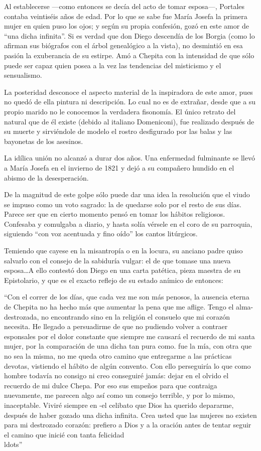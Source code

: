\documentclass[10pt,twoside,openright]{memoir}
\begin{document}
Al establecerse ---como entonces se decía del acto de tomar esposa---,
Portales contaba veintiséis años de edad. Por lo que se sabe fue María
Josefa la primera mujer en quien puso los ojos; y según su propia
confesión, gozó en este amor de ``una dicha infinita''.
Si es verdad que don Diego descendía
de los Borgia (como lo afirman sus biógrafos con el árbol genealógico a
la vista), no desmintió en esa pasión la exuberancia de su estirpe. Amó
a Chepita con la intensidad de que sólo puede ser capaz quien posea a la
vez las tendencias del misticismo y el sensualismo.

La posteridad desconoce el aspecto material de la inspiradora de este
amor, pues no quedó de ella pintura ni descripción. Lo cual no es de
extrañar, desde que a su propio marido no le conocemos la verdadera
fisonomía. El único retrato del natural que de él existe (debido al
italiano Domeniconi), fue realizado después de su muerte y sirviéndole
de modelo el rostro desfigurado por las balas y las bayonetas de los
asesinos.

La idílica unión no alcanzó a durar dos años. Una enfermedad fulminante
se llevó a María Josefa en el invierno de 1821 y dejó a su compañero
hundido en el abismo de la desesperación.

De
la magnitud de este golpe sólo puede dar una idea la resolución que el
viudo se impuso como un voto sagrado: la de quedarse solo por el resto
de sus días. Parece ser que en cierto momento pensó en tomar los hábitos
religiosos. Confesaba y comulgaba a diario, y hasta solía vérsele en el
coro de su parroquia, siguiendo ``con voz acentuada y fino oído'' los
cantos litúrgicos.

Temiendo que cayese en la misantropía o en la locura, su anciano padre
quiso salvarlo con el consejo de la sabiduría vulgar: el de que tomase
una nueva esposa\ldots A ello contestó don Diego en una carta patética,
pieza maestra de su Epistolario, y que es el exacto reflejo de su estado
anímico de entonces:

``Con el correr de los días, que cada
vez me son más penosos, la ausencia eterna de Chepita no ha hecho más
que aumentar la pena que me aflige. Tengo el alma- destrozada, no
encontrando sino en la religión el consuelo que mi corazón necesita. He
llegado a persuadirme de que no pudiendo volver a contraer esponsales
por el dolor constante que siempre me causará el recuerdo de mi santa
mujer, por la comparación de una dicha tan pura como. fue la mía, con
otra que no sea la misma, no me queda otro camino que entregarme a las
prácticas devotas, vistiendo el hábito de algún convento. Con ello
perseguiría lo que como hombre todavía no consigo ni creo conseguiré
jamás: dejar en el olvido el recuerdo de mi
dulce Chepa. Por eso sus empeños
para que contraiga nuevamente, me parecen algo así como un consejo
terrible, y por lo mismo, inaceptable. Viviré siempre en -el celibato
que Dios ha querido depararme, después de haber gozado una dicha
infinita. Crea usted que las mujeres no existen para mi destrozado
corazón: prefiero a Dios y a la oración antes de tentar seguir el camino
que inicié con tanta felicidad\\ldots''
\end{document}
